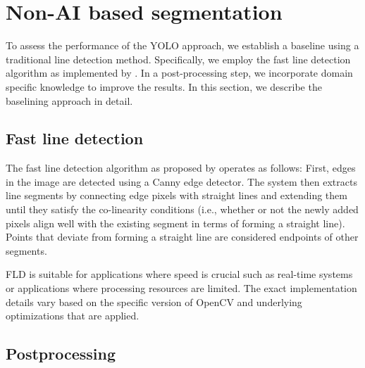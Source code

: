 \documentclass[Master,MDS,english]{BASE/twbook} %
\begin{document}
\section{Non-AI based segmentation}

To assess the performance of the YOLO approach, we establish a baseline using a traditional line detection method. Specifically, we employ the fast line detection algorithm as implemented by \cite{FLD}. In a post-processing step, we incorporate domain specific knowledge to improve the results.
In this section, we describe the baselining approach in detail.
 
 \subsection{Fast line detection}


The fast line detection algorithm as proposed by \cite{fld_inproceedings} operates as follows: 
First, edges in the image are detected using a Canny edge detector. The system then extracts line segments by connecting edge pixels with straight lines and extending them until they satisfy the co-linearity conditions (i.e., whether or not the newly added pixels align well with the existing segment in terms of forming a straight line). Points that deviate from forming a straight line are considered endpoints of other segments. 

FLD is suitable for applications where speed is crucial such as real-time systems or applications where processing resources are limited.
The exact implementation details vary based on the specific version of OpenCV and underlying optimizations that are applied.

\subsection{Postprocessing}
\end{document}
